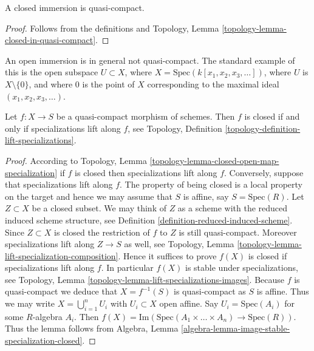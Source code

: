 \begin{lemma}
\label{lemma-closed-immersion-quasi-compact}
A closed immersion is quasi-compact.
\end{lemma}

\begin{proof}
Follows from the definitions and
Topology, Lemma \ref{topology-lemma-closed-in-quasi-compact}.
\end{proof}

\begin{example}
\label{example-open-immersion-not-quasi-compact}
An open immersion is in general not quasi-compact.
The standard example of this is the open subspace
$U \subset X$, where $X = \text{Spec}(k[x_1, x_2, x_3, \ldots])$,
where $U$ is $X \setminus \{0\}$, and where $0$ is the point
of $X$ corresponding to the maximal ideal
$(x_1, x_2, x_3, \ldots)$.
\end{example}

\begin{lemma}
\label{lemma-quasi-compact-closed}
Let $f : X \to S$ be a quasi-compact morphism of schemes.
Then $f$ is closed if and only if specializations lift
along $f$, see
Topology, Definition \ref{topology-definition-lift-specializations}.
\end{lemma}

\begin{proof}
According to
Topology, Lemma \ref{topology-lemma-closed-open-map-specialization}
if $f$ is closed then specializations lift along $f$.
Conversely, suppose that specializations lift along $f$.
The property of being closed is a local property on the target
and hence we may assume that $S$ is affine, say $S = \text{Spec}(R)$.
Let $Z \subset X$ be a closed subset. We may think of $Z$
as a scheme with the reduced induced scheme structure, see
Definition \ref{definition-reduced-induced-scheme}.
Since $Z \subset X$ is closed the restriction
of $f$ to $Z$ is still quasi-compact. Moreover specializations lift
along $Z \to S$ as well,
see Topology, Lemma \ref{topology-lemma-lift-specialization-composition}.
Hence it suffices to prove $f(X)$ is closed if specializations lift along $f$.
In particular $f(X)$ is stable under specializations, see
Topology, Lemma \ref{topology-lemma-lift-specializations-images}.
Because $f$ is quasi-compact we deduce that $X = f^{-1}(S)$ is
quasi-compact as $S$ is affine. Thus we may write
$X = \bigcup_{i = 1}^n U_i$ with $U_i \subset X$ open affine.
Say $U_i = \text{Spec}(A_i)$ for some $R$-algebra $A_i$.
Then $f(X) = \text{Im}(\text{Spec}(A_1 \times \ldots \times A_n)
\to \text{Spec}(R))$. Thus the lemma follows from
Algebra, Lemma \ref{algebra-lemma-image-stable-specialization-closed}.
\end{proof}










